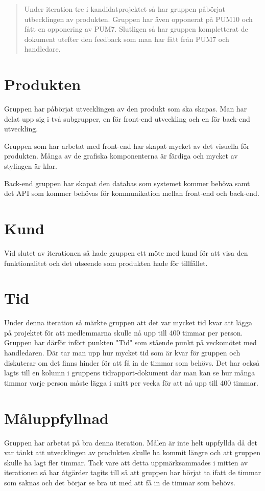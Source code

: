 \documentclass[a4paper,10pt, twoside]{article}
\begin{document}


\clearpage
\begin{abstract}
\noindent Under iteration tre i kandidatprojektet så har gruppen påbörjat utbecklingen av produkten. Gruppen har även opponerat på PUM10 och fått en opponering av PUM7.
Slutligen så har gruppen kompletterat de dokument utefter den feedback som man har fått från PUM7 och handledare.
\end{abstract}
\clearpage

\section{Produkten}
\label{sec:Produkten}
Gruppen har påbörjat utvecklingen av den produkt som ska skapas. Man har delat upp sig i två subgrupper, en för front-end utveckling och en för back-end utveckling.

Gruppen som har arbetat med front-end har skapat mycket av det visuella för produkten. Många av de grafiska komponenterna är färdiga och mycket av stylingen är klar.

Back-end gruppen har skapat den databas som systemet kommer behöva samt det API som kommer behövas för kommunikation mellan front-end och back-end.

\section{Kund}
Vid slutet av iterationen så hade gruppen ett möte med kund för att visa den funktionalitet och det utseende som produkten hade för tillfället.

\section{Tid}
Under denna iteration så märkte gruppen att det var mycket tid kvar att lägga på projektet för att medlemmarna skulle nå upp till 400 timmar per person. Gruppen har därför infört punkten "Tid" som stående punkt på veckomötet med handledaren. Där tar man upp hur mycket tid som är kvar för gruppen och diskuterar om det finns hinder för att få in de timmar som behövs.
Det har också lagts till en kolumn i gruppens tidrapport-dokument där man kan se hur många timmar varje person måste lägga i snitt per vecka för att nå upp till 400 timmar.

\section{Måluppfyllnad}
Gruppen har arbetat på bra denna iteration. Målen är inte helt uppfyllda då det var tänkt att utvecklingen av produkten skulle ha kommit längre och att gruppen skulle ha lagt fler timmar. Tack vare att detta uppmärksammades i mitten av iterationen så har åtgärder tagits till så att gruppen har börjat ta ifatt de timmar som saknas och det börjar se bra ut med att få in de timmar som behövs.
\end{document}
